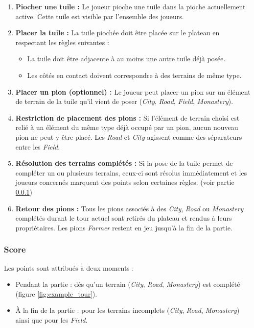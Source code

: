 \documentclass[11pt]{article}
\begin{document}
\begin{enumerate}
  \item \textbf{Piocher une tuile :}  
  Le joueur pioche une tuile dans la pioche actuellement active. Cette tuile est visible par l’ensemble des joueurs.

  \item \textbf{Placer la tuile :}  
  La tuile piochée doit être placée sur le plateau en respectant les règles suivantes :
  \begin{itemize}
    \item[-] La tuile doit être adjacente à au moins une autre tuile déjà posée.
    \item[-] Les côtés en contact doivent correspondre à des terrains de même type.
  \end{itemize}

  \item \textbf{Placer un pion (optionnel) :}  
  Le joueur peut placer un pion sur un élément de terrain de la tuile qu’il vient de poser (\textit{City}, \textit{Road}, \textit{Field}, \textit{Monastery}).

  \item \textbf{Restriction de placement des pions :}  
  Si l’élément de terrain choisi est relié à un élément du même type déjà occupé par un pion, aucun nouveau pion ne peut y être placé.
  Les \textit{Road} et \textit{City} agissent comme des séparateurs entre les \textit{Field}.

  \item \textbf{Résolution des terrains complétés :}  
  Si la pose de la tuile permet de compléter un ou plusieurs terrains, ceux-ci sont résolus immédiatement et les joueurs concernés marquent des points selon certaines règles. (voir partie \ref{subsubsec:score})

  \item \textbf{Retour des pions :}  
  Tous les pions associés à des \textit{City}, \textit{Road} ou \textit{Monastery} complétés durant le tour actuel sont retirés du plateau et rendus à leurs propriétaires. Les pions \textit{Farmer} restent en jeu jusqu’à la fin de la partie.

\end{enumerate}

\subsubsection{Score}
\label{subsubsec:score}
Les points sont attribués à deux moments :
\begin{itemize}
  \item[$\bullet$] Pendant la partie : dès qu’un terrain  (\textit{City}, \textit{Road}, \textit{Monastery}) est complété (figure \ref{fig:example_tour}).
  \item[$\bullet$] À la fin de la partie : pour les terrains incomplets (\textit{City}, \textit{Road}, \textit{Monastery}) ainsi que pour les \textit{Field}.
\end{itemize}
\end{document}
